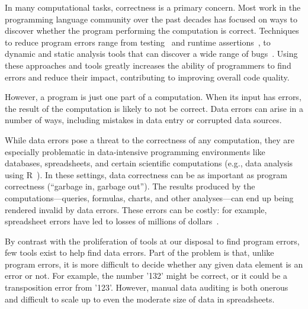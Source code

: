 In many computational tasks, correctness is a primary concern. Most
work in the programming language community over the past decades has
focused on ways to discover whether the program performing the computation is
correct. Techniques to reduce program errors range from
testing~\cite{unittesting,fuzztesting} and runtime
assertions~\cite{samanderansthing,others}, to dynamic and static
analysis tools that can discover a wide range of
bugs~\cite{valgrind,dawsonthing,otherpcmemberfoo}. Using these
approaches and tools greatly increases the ability of programmers to
find errors and reduce their impact, contributing to improving overall
code quality.

However, a program is just one part of a computation. When its input
has errors, the result of the computation is likely to not be
correct. Data errors can arise in a number of ways, including mistakes
in data entry or corrupted data sources.


While data errors pose a threat to the correctness of any computation,
they are especially problematic in data-intensive programming
environments like databases, spreadsheets, and certain scientific
computations (e.g., data analysis using R~\cite{FIXME}). In these settings,
data correctness can be as important as program correctness (``garbage
in, garbage out''). The results produced by the
computations---queries, formulas, charts, and other analyses---can end
up being rendered invalid by data errors. These errors can be costly:
for example, spreadsheet errors have led to losses of millions of
dollars~\cite{FIXME}.




By contrast with the proliferation of tools at our disposal to find
program errors, few tools exist to help find data errors. Part of the
problem is that, unlike program errors, it is more difficult to decide
whether any given data element is an error or not. For example, the
number '132' might be correct, or it could be a transposition error
from '123'. However, manual data auditing is both onerous and
difficult to scale up to even the moderate size of data in
spreadsheets.


